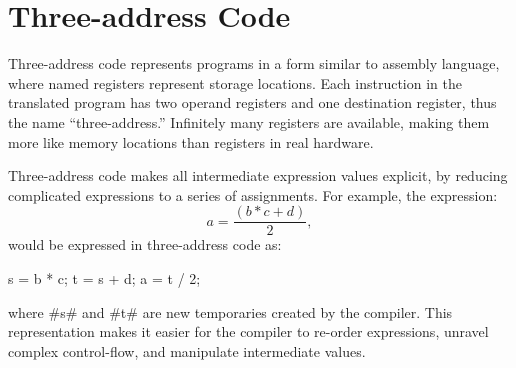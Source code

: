 \documentclass[12pt]{report}
\begin{document}



\section{Three-address Code}
\label{mil_sec2}

Three-address code represents programs in a form similar to assembly
language, where named registers represent storage locations. Each
instruction in the translated program has two operand registers and
one destination register, thus the name ``three-address.'' Infinitely
many registers are available, making them more like memory locations
than registers in real hardware.

Three-address code makes all intermediate expression values explicit, 
by reducing complicated expressions to a series of assignments. 
For example, the expression:
\begin{equation}
  a = \frac{(b * c + d)}{2},
\end{equation}
would be expressed in three-address code as:
\begin{AVerb}
  s = b * c;
  t = s + d;
  a = t / 2;
\end{AVerb}
where #s# and #t# are new temporaries created by the compiler. This 
representation makes it easier for the compiler to re-order expressions,
unravel complex control-flow, and manipulate intermediate values. 
\end{document}
